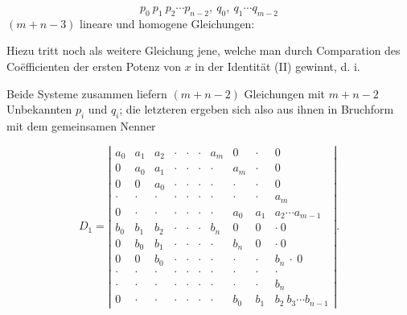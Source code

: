 \[
p_0\ p_1\ p_2 \cdots p_{n-2},\ q_0,\ q_1 \cdots q_{m-2}
\]
$(m+n-3)$ lineare und homogene Gleichungen:




Hiezu tritt noch als weitere Gleichung jene, welche man durch Comparation des Co\"efficienten der ersten Potenz von $x$ in der Identität (II) gewinnt, d. i.


Beide Systeme zusammen liefern $(m+n-2)$ Gleichungen mit $m+n-2$ Unbekannten $p_i$ und $q_i$; die letzteren ergeben sich also aus ihnen in Bruchform mit dem gemeinsamen Nenner

\[
D_1 =
\left|
\begin{array}{cccccccccc}
a_0 & a_1 & a_2 & \cdot & \cdot & \cdot & a_m & 0 & \cdot & 0\\
0 & a_0 & a_1 & \cdot & \cdot & \cdot & \cdot & a_m & \cdot & 0\\
0 & 0 & a_0 & \cdot & \cdot & \cdot & \cdot & \cdot & \cdot & 0\\
\cdot & \cdot & \cdot & \cdot & \cdot & \cdot & \cdot & \cdot & \cdot & a_m\\
0 & \cdot & \cdot & \cdot & \cdot & \cdot & \cdot & a_0 & a_1 & a_2 \cdots a_{m-1}\\
b_0 & b_1 & b_2 & \cdot & \cdot & \cdot & b_n & 0 & 0 & \cdot\ 0\\
0 & b_0 & b_1 & \cdot & \cdot & \cdot & \cdot & b_n & 0 & \cdot\ 0\\
0 & 0 & b_0 & \cdot & \cdot & \cdot & \cdot & \cdot & \cdot & b_n\ \cdot\ 0\\
\cdot & \cdot & \cdot & \cdot & \cdot & \cdot & \cdot & \cdot & \cdot & \cdot\\
\cdot & \cdot & \cdot & \cdot & \cdot & \cdot & \cdot & \cdot & \cdot & b_n\\
0 & \cdot & \cdot & \cdot & \cdot & \cdot & \cdot & b_0 & b_1 & b_2\ b_3 \cdots b_{n-1}
\end{array}
\right|.
\]


